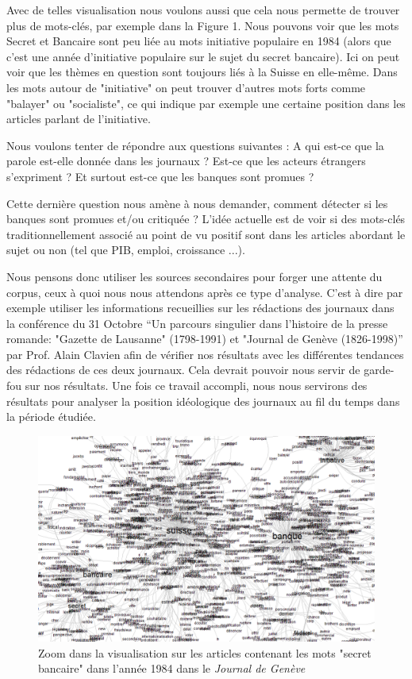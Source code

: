 \documentclass[11pt]{article}
\begin{document}
Avec de telles visualisation nous voulons aussi que cela nous permette de
trouver plus de mots-clés, par exemple dans la Figure 1. Nous pouvons voir que
les mots Secret et Bancaire sont peu liée au mots initiative populaire en 1984
(alors que c'est une année d'initiative populaire sur le sujet du secret
bancaire). Ici on peut voir que les thèmes en question sont toujours liés à la
Suisse en elle-même. Dans les mots autour de "initiative" on peut trouver
d'autres mots forts comme "balayer" ou "socialiste", ce qui indique par exemple
une certaine position dans les articles parlant de l'initiative.

Nous voulons tenter de répondre aux questions suivantes : A qui est-ce que la
parole est-elle donnée dans les journaux ? Est-ce que les acteurs étrangers
s'expriment ? Et surtout est-ce que les banques sont promues ?

Cette dernière question nous amène à nous demander, comment détecter si les
banques sont promues et/ou critiquée ? L'idée actuelle est de voir si des
mots-clés traditionnellement associé au point de vu positif sont dans les
articles abordant le sujet ou non (tel que PIB, emploi, croissance ...).
    
Nous pensons donc utiliser les sources secondaires pour forger une attente du
corpus, ceux à quoi nous nous attendons après ce type d’analyse. C’est à dire
par exemple utiliser les informations recueillies sur les rédactions des
journaux dans la conférence du 31 Octobre “Un parcours singulier dans l'histoire
de la presse romande: "Gazette de Lausanne" (1798-1991) et "Journal de Genève
(1826-1998)” par Prof. Alain Clavien afin de vérifier nos résultats avec les
différentes tendances des rédactions de ces deux journaux. Cela devrait pouvoir
nous servir de garde-fou sur nos résultats. Une fois ce travail accompli, nous
nous servirons des résultats pour analyser la position idéologique des journaux
au fil du temps dans la période étudiée. 

\begin{figure}
  \includegraphics[width=7in]{reduced.png}
  \caption{Zoom dans la visualisation sur les articles contenant les mots "secret 
bancaire" dans l'année 1984 dans le \textit{Journal de Genève}}
\end{figure}



\end{document}
